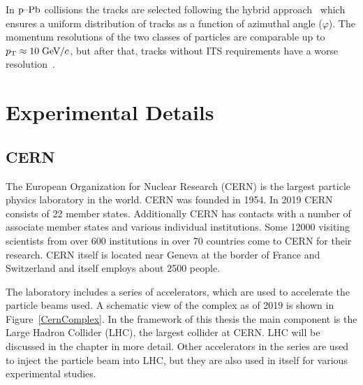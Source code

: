 In $\mbox{p--Pb}$ collisions the tracks are selected following the hybrid approach~\cite{hybridExplanation} which ensures a uniform distribution of tracks as a function of azimuthal angle ($\varphi$). The momentum resolutions of the two classes of particles are comparable up to $p_{\rm T} \approx 10\;\mathrm{GeV}\kern-0.05em/\kern-0.02em c$, but after that, tracks without ITS requirements have a worse resolution~\cite{alicePerformance,aliceBackgroundFluctuation}.


\section{Experimental Details}
\label{sec:exp}
\subsection{CERN}
The European Organization for Nuclear Research (CERN) is the largest particle physics laboratory in the world. CERN was founded in 1954. In 2019 CERN consists of 22 member states. Additionally CERN has contacts with a number of associate member states and various individual institutions. Some 12000 visiting scientists from over 600 institutions in over 70 countries come to CERN for their research. CERN itself is located near Geneva at the border of France and Switzerland and  itself employs about 2500 people.

The laboratory includes a series of accelerators, which are used to accelerate the particle beams used. A schematic view of the complex as of 2019 is shown in Figure~\ref{CernComplex}. In the framework of this thesis the main component is the Large Hadron Collider (LHC), the largest collider at CERN. LHC will be discussed in the chapter in more detail. Other accelerators in the series are used to inject the particle beam into LHC, but they are also used in itself for various experimental studies. 

